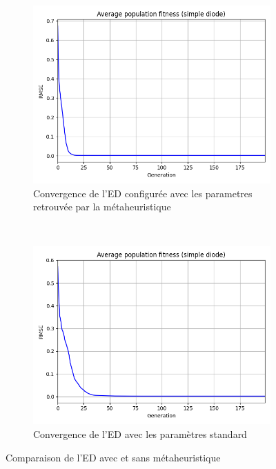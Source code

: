 \begin{figure}
    \centering
    \begin{subfigure}[b]{0.45\textwidth}
        \includegraphics[width=\textwidth]{resources/pwp/metafit.png}
        \caption{Convergence de l'ED configurée avec les parametres retrouvée par la métaheuristique}
    \end{subfigure}
    ~
    \begin{subfigure}[b]{0.45\textwidth}
        \includegraphics[width=\textwidth]{resources/pwp/fitness.png}
        \caption{Convergence de l'ED avec les paramètres standard}
    \end{subfigure}
    \caption{Comparaison de l'ED avec et sans métaheuristique}
    \label{fig:metaconv}
\end{figure}

